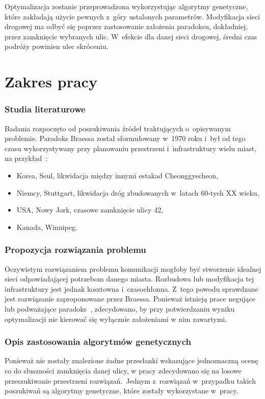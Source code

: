\documentclass[twoside,12pt]{report}
\begin{document}
Optymalizacja zostanie przeprowadzona wykorzystując algorytmy genetyczne, które zakładają użycie pewnych z~góry ustalonych parametrów. Modyfikacja sieci drogowej ma odbyć się poprzez zastosowanie założenia paradoksu, dokładniej, przez zamknięcie wybranych ulic.  W~efekcie dla danej sieci drogowej, średni czas podróży powinien ulec skróceniu.

\section{Zakres pracy}
\subsubsection{Studia literaturowe}
Badania rozpoczęto od poszukiwania źródeł traktujących o~opisywanym problemie. Paradoks Braessa został sformułowany w~1970 roku i~był od tego czasu wykorzystywany przy planowaniu przestrzeni i~infrastruktury wielu miast, na przykład~\cite{urban}:

\begin{itemize}
\item Korea, Seul, likwidacja między innymi estakad Cheonggyecheon,
\item Niemcy, Stuttgart, likwidacja dróg zbudowanych w~latach 60-tych XX wieku,
\item USA, Nowy Jork, czasowe zamknięcie ulicy 42,
\item Kanada, Winnipeg.
\end{itemize}  

\subsubsection{Propozycja rozwiązania problemu}
Oczywistym rozwiązaniem problemu komunikacji mogłoby być stworzenie idealnej sieci odpowiadającej potrzebom danego miasta. Rozbudowa lub modyfikacja tej infrastruktury jest jednak kosztowna i~czasochłonna. Z~tego powodu sprawdzane jest rozwiązanie zaproponowane przez Braessa. Ponieważ istnieją prace negujące lub podważające paradoks~\cite{newinsights}, zdecydowano, by przy potwierdzaniu wyniku optymalizacji nie kierować się wyłącznie założeniami w nim zawartymi.

\subsubsection{Opis zastosowania algorytmów genetycznych}
Ponieważ nie zostały znalezione żadne przesłanki wskazujące jednoznaczną ocenę co do słuszności zamknięcia danej ulicy, w pracy zdecydowano się na losowe przeszukiwanie przestrzeni rozwiązań.~Jednym z~rozwiązań w~przypadku takich poszukiwań są algorytmy genetyczne, które zostały wykorzystane w~pracy.
\end{document}

